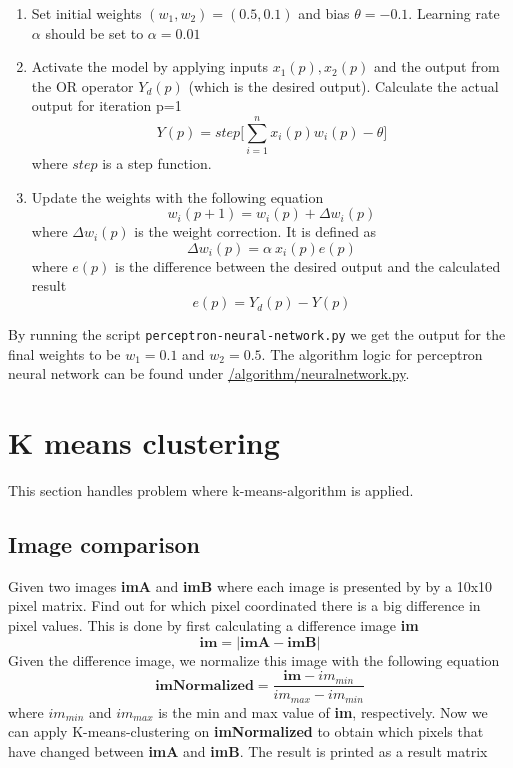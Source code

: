 \documentclass{article}
\begin{document}
    \begin{enumerate}
        \item Set initial weights $(w_1, w_2) = (0.5, 0.1)$ and bias $\theta = -0.1$. Learning rate $\alpha$ should be set to $\alpha = 0.01$ 
        \item Activate the model by applying inputs $x_1(p), x_2(p)$ and the output from the OR operator $Y_d(p)$ (which is the desired output). Calculate the actual output for iteration p=1 
        \begin{equation}
            Y(p) = step\Bigg[\sum_{i=1}^n x_i(p)w_i(p) - \theta\Bigg]
        \end{equation}
        where $step$ is a step function.
        \item Update the weights with the following equation
        \begin{equation}
            w_i(p+1) = w_i(p) + \Delta w_i(p)
        \end{equation}
        where $\Delta w_i(p)$ is the weight correction. It is defined as 
        \begin{equation}
            \Delta w_i(p) = \alpha\ x_i(p) e(p)
        \end{equation}
        where $e(p)$ is the difference between the desired output and the calculated result
        \begin{equation}
            e(p) = Y_d(p) - Y(p)
        \end{equation}
    \end{enumerate}
    By running the script \texttt{perceptron-neural-network.py} we get the output for the final weights to be
    $w_1=0.1$ and $w_2 = 0.5$.
    The algorithm logic for perceptron neural network can be found under \url{/algorithm/neuralnetwork.py}.
    \section{K means clustering}
    This section handles problem where k-means-algorithm is applied.
        \subsection{Image comparison}
        \label{im}
        Given two images \textbf{imA} and \textbf{imB} where each image is presented by by a 10x10 pixel matrix. Find out for which pixel coordinated there is a big difference in pixel values. This is done by first calculating a difference image \textbf{im}
        \begin{equation}
            \textbf{im} = |\textbf{imA} - \textbf{imB}|
        \end{equation}
        Given the difference image, we normalize this image with the following equation
        \begin{equation}
            \textbf{imNormalized} = \frac{\textbf{im} - im_{min}}{im_{max} - im_{min}}
        \end{equation}
        where $im_{min}$ and $im_{max}$ is the min and max value of \textbf{im}, respectively. Now we can apply K-means-clustering on \textbf{imNormalized} to obtain which pixels that have changed between \textbf{imA} and \textbf{imB}. The result is printed as a result matrix 
        
\end{document}
